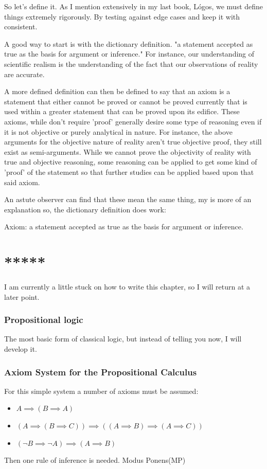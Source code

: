 So let's define it. As I mention extensively in my last book, Lógos, we must define things extremely rigorously. By testing against edge cases and keep it with consistent.

A good way to start is with the dictionary definition. "a statement accepted as true as the basis for argument or inference." For instance, our understanding of scientific realism is the understanding of the fact that our observations of reality are accurate.

A more defined definition can then be defined to say that an axiom is a statement that either cannot be proved or cannot be proved currently that is used within a greater statement that can be proved upon its edifice. These axioms, while don't require 'proof' generally desire some type of reasoning even if it is not objective or purely analytical in nature. For instance, the above arguments for the objective nature of reality aren't true objective proof, they still exist as semi-arguments. While we cannot prove the objectivity of reality with true and objective reasoning, some reasoning can be applied to get some kind of 'proof' of the statement so that further studies can be applied based upon that said axiom.

An astute observer can find that these mean the same thing, my is more of an explanation so, the dictionary definition does work:
\begin{definition}
    Axiom: a statement accepted as true as the basis for argument or inference.
\end{definition}












\section{***** }
I am currently a little stuck on how to write this chapter, so I will return at a later point.
\subsubsection{Propositional logic}
The most basic form of classical logic, but instead of telling you now, I will develop it.
\subsubsection{Axiom System for the Propositional Calculus}
For this simple system a number of axioms must be assumed:
\begin{itemize}
    \item $A \implies (B \implies A) $
    \item $(A \implies (B \implies C)) \implies ((A \implies B) \implies (A \implies C)) $
    \item $ (\neg B \implies \neg A) \implies (A \implies B) $


\end{itemize}
Then one rule of inference is needed. Modus Ponens(MP)

